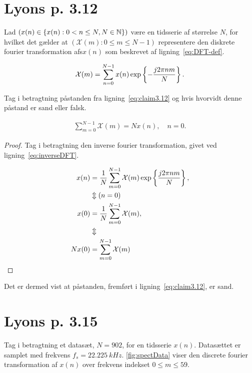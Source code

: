 \section{Lyons p. 3.12}

Lad $ \left(x(n) \in \left\{ x(n) : 0 < n \le N, N \in \mathbb{N} \right\} \right) $ være en tidsserie af størrelse $ N $,
for hvilket det gælder at $ \left( \mathcal{X}(m) : 0 \le m \le N - 1 \right) $ representere den diskrete fourier transformation 
afs$ x(n) $ som beskrevet af ligning~\eqref{eq:DFT-def}.

\begin{align}
  \label{eq:DFT-def}
  \mathcal{X}(m) = \sum_{n = 0}^{N - 1} x(n)\exp\left\{ -\frac{j2 \pi nm}{N} \right\}.
\end{align}

Tag i betragtning påstanden fra ligning~\eqref{eq:claim3.12} og hvis hvorvidt denne påstand er sand eller falsk. 

\begin{align}
  \label{eq:claim3.12}
  \sum_{m = 0}^{N-1} \mathcal{X}(m) = Nx(n), \quad n = 0.
\end{align}

\begin{proof}
  Tag i betragtning den inverse fourier transformation, givet ved ligning~\eqref{eq:inverseDFT}.

  \begin{align}
    \label{eq:inverseDFT}
    x(n) &= \frac{1}{N} \sum_{m = 0}^{N - 1} \mathcal{X}(m) \exp\left\{ \frac{j 2 \pi n m}{N} \right\}, \\
         &\Updownarrow (n = 0) \\
    x(0) &= \frac{1}{N} \sum_{m = 0}^{N - 1} \mathcal{X}(m), \\
         &\Updownarrow \\
    Nx(0) &= \sum_{m = 0}^{N - 1} \mathcal{X}(m)
  \end{align}
\end{proof}

Det er dermed vist at påstanden, fremført i ligning~\eqref{eq:claim3.12}, er sand.

\newpage

\section{Lyons p. 3.15}

Tag i betragtning et datasæt, $ N = 902 $, for en tidsserie $ x(n) $. Datasættet er samplet med
frekvens $ f_{s} = 22.225\ kHz $. \autoref{fig:spectData} viser den discrete fourier transformation
af $ x(n) $ over frekvens indekset $ 0 \le m \le 59 $.


